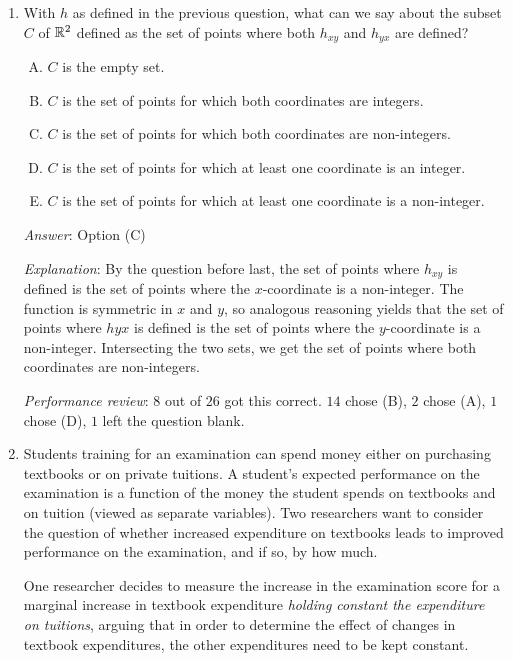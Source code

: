 \documentclass[10pt]{amsart}
\begin{document}
\begin{enumerate}
  {\em Answer}: Option (B)

  {\em Explanation}: See the explanation for the preceding question.

  {\em Performance review}: Nobody got this correct. $8$ chose (D),
  $7$ chose (E), $5$ each chose (A) and (C). $1$ left the question
  blank.
\item With $h$ as defined in the previous question, what can we say
  about the subset $C$ of $\mathbb{R}^2$ defined as the set of points where
  both $h_{xy}$ and $h_{yx}$ are defined?

  \begin{enumerate}[(A)]
  \item $C$ is the empty set.
  \item $C$ is the set of points for which both coordinates are integers.
  \item $C$ is the set of points for which both coordinates are non-integers.
  \item $C$ is the set of points for which at least one coordinate is an integer.
  \item $C$ is the set of points for which at least one coordinate is
    a non-integer.
  \end{enumerate}

  {\em Answer}: Option (C)

  {\em Explanation}: By the question before last, the set of points
  where $h_{xy}$ is defined is the set of points where the
  $x$-coordinate is a non-integer. The function is symmetric in $x$
  and $y$, so analogous reasoning yields that the set of points where
  $h{yx}$ is defined is the set of points where the $y$-coordinate is
  a non-integer. Intersecting the two sets, we get the set of points
  where both coordinates are non-integers.

  {\em Performance review}: $8$ out of $26$ got this correct. $14$
  chose (B), $2$ chose (A), $1$ chose (D), $1$ left the question blank.

\item Students training for an examination can spend money either on
  purchasing textbooks or on private tuitions. A student's expected
  performance on the examination is a function of the money the
  student spends on textbooks and on tuition (viewed as separate
  variables). Two researchers want to consider the question of whether
  increased expenditure on textbooks leads to improved performance on
  the examination, and if so, by how much.

  One researcher decides to measure the increase in the examination
  score for a marginal increase in textbook expenditure {\em holding
  constant the expenditure on tuitions}, arguing that in order to
  determine the effect of changes in textbook expenditures, the other
  expenditures need to be kept constant.


\end{enumerate}
\end{document}

